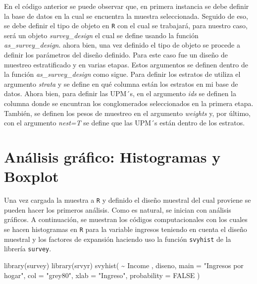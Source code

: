 \documentclass[
  12pt,
]{book}
\newenvironment{Shaded}{\begin{snugshade}}{\end{snugshade}}
\newcommand{\AttributeTok}[1]{\textcolor[rgb]{0.77,0.63,0.00}{#1}}
\newcommand{\ConstantTok}[1]{\textcolor[rgb]{0.00,0.00,0.00}{#1}}
\newcommand{\FunctionTok}[1]{\textcolor[rgb]{0.00,0.00,0.00}{#1}}
\newcommand{\NormalTok}[1]{#1}
\newcommand{\SpecialCharTok}[1]{\textcolor[rgb]{0.00,0.00,0.00}{#1}}
\newcommand{\StringTok}[1]{\textcolor[rgb]{0.31,0.60,0.02}{#1}}
\begin{document}
En el código anterior se puede observar que, en primera instancia se debe definir la base de datos en la cual se encuentra la muestra seleccionada. Seguido de eso, se debe definir el tipo de objeto en \texttt{R} con el cual se trabajará, para nuestro caso, será un objeto \emph{survey\_design} el cual se define usando la función \emph{as\_survey\_design}. ahora bien, una vez definido el tipo de objeto se procede a definir los parámetros del diseño definido. Para este caso fue un diseño de muestreo estratificado y en varias etapas. Estos argumentos se definen dentro de la función \emph{as\_survey\_design} como sigue. Para definir los estratos de utiliza el argumento \emph{strata} y se define en qué columna están los estratos en mi base de datos. Ahora bien, para definir las UPM´s, en el argumento \emph{ids} se definen la columna donde se encuntran los conglomerados seleccionados en la primera etapa. También, se definen los pesos de muestreo en el argumento \emph{weights} y, por último, con el argumento \emph{nest=T} se define que las UPM´s están dentro de los estratos.

\hypertarget{anuxe1lisis-gruxe1fico-histogramas-y-boxplot}{%
\section{Análisis gráfico: Histogramas y Boxplot}\label{anuxe1lisis-gruxe1fico-histogramas-y-boxplot}}

Una vez cargada la muestra a \texttt{R} y definido el diseño muestral del cual proviene se pueden hacer los primeros análisis. Como es natural, se inician con análisis gráficos. A continuación, se muestran los códigos computacionales con los cuales se hacen histogramas en \texttt{R} para la variable ingresos teniendo en cuenta el diseño muestral y los factores de expansión haciendo uso la función \texttt{svyhist} de la librería \texttt{survey}.

\begin{Shaded}
\begin{Highlighting}[]
\FunctionTok{library}\NormalTok{(survey)}
\FunctionTok{library}\NormalTok{(srvyr)}
\FunctionTok{svyhist}\NormalTok{(}
  \SpecialCharTok{\textasciitilde{}}\NormalTok{ Income ,}
\NormalTok{  diseno,}
  \AttributeTok{main =} \StringTok{"Ingresos por hogar"}\NormalTok{,}
  \AttributeTok{col =} \StringTok{"grey80"}\NormalTok{,}
  \AttributeTok{xlab =} \StringTok{"Ingreso"}\NormalTok{,}
  \AttributeTok{probability =} \ConstantTok{FALSE}
\NormalTok{)}
\end{Highlighting}
\end{Shaded}
\end{document}
